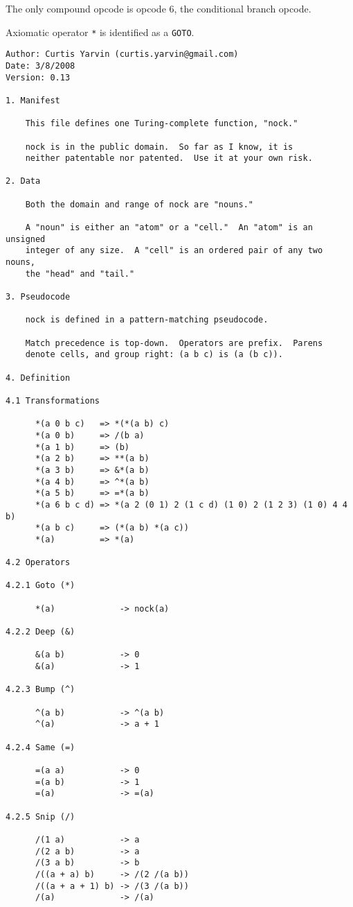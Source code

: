 \documentclass[twoside]{article}
\begin{document}
The only compound opcode is opcode 6, the conditional branch opcode.

Axiomatic operator \texttt{*} is identified as a \texttt{GOTO}.

\begin{lstlisting}[label=lst:nock13k,caption={Nock 13K, 8 March 2008.},style=listingcode]
Author: Curtis Yarvin (curtis.yarvin@gmail.com)
Date: 3/8/2008
Version: 0.13

1. Manifest

    This file defines one Turing-complete function, "nock."

    nock is in the public domain.  So far as I know, it is
    neither patentable nor patented.  Use it at your own risk.

2. Data

    Both the domain and range of nock are "nouns."

    A "noun" is either an "atom" or a "cell."  An "atom" is an unsigned
    integer of any size.  A "cell" is an ordered pair of any two nouns,
    the "head" and "tail."

3. Pseudocode

    nock is defined in a pattern-matching pseudocode.

    Match precedence is top-down.  Operators are prefix.  Parens
    denote cells, and group right: (a b c) is (a (b c)).

4. Definition

4.1 Transformations

      *(a 0 b c)   => *(*(a b) c)
      *(a 0 b)     => /(b a)
      *(a 1 b)     => (b)
      *(a 2 b)     => **(a b)
      *(a 3 b)     => &*(a b)
      *(a 4 b)     => ^*(a b)
      *(a 5 b)     => =*(a b)
      *(a 6 b c d) => *(a 2 (0 1) 2 (1 c d) (1 0) 2 (1 2 3) (1 0) 4 4 b)
      *(a b c)     => (*(a b) *(a c))
      *(a)         => *(a)

4.2 Operators

4.2.1 Goto (*)

      *(a)             -> nock(a)

4.2.2 Deep (&)

      &(a b)           -> 0
      &(a)             -> 1

4.2.3 Bump (^)

      ^(a b)           -> ^(a b)
      ^(a)             -> a + 1

4.2.4 Same (=)

      =(a a)           -> 0
      =(a b)           -> 1
      =(a)             -> =(a)

4.2.5 Snip (/)

      /(1 a)           -> a
      /(2 a b)         -> a
      /(3 a b)         -> b
      /((a + a) b)     -> /(2 /(a b))
      /((a + a + 1) b) -> /(3 /(a b))
      /(a)             -> /(a)
\end{lstlisting}
\end{document}
